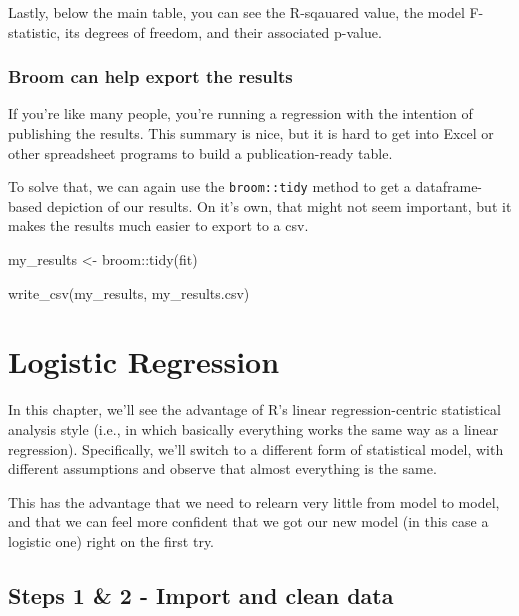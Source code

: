 \documentclass[
]{book}
\newenvironment{Shaded}{\begin{snugshade}}{\end{snugshade}}
\newcommand{\FunctionTok}[1]{\textcolor[rgb]{0.00,0.00,0.00}{#1}}
\newcommand{\NormalTok}[1]{#1}
\newcommand{\OtherTok}[1]{\textcolor[rgb]{0.56,0.35,0.01}{#1}}
\newcommand{\SpecialCharTok}[1]{\textcolor[rgb]{0.00,0.00,0.00}{#1}}
\newcommand{\StringTok}[1]{\textcolor[rgb]{0.31,0.60,0.02}{#1}}
\begin{document}
Lastly, below the main table, you can see the R-sqauared value, the model F-statistic, its degrees of freedom, and their associated p-value.

\hypertarget{broom-can-help-export-the-results}{%
\subsection{Broom can help export the results}\label{broom-can-help-export-the-results}}

If you're like many people, you're running a regression with the intention of publishing the results. This summary is nice, but it is hard to get into Excel or other spreadsheet programs to build a publication-ready table.

To solve that, we can again use the \texttt{broom::tidy} method to get a dataframe-based depiction of our results. On it's own, that might not seem important, but it makes the results much easier to export to a csv.

\begin{Shaded}
\begin{Highlighting}[]
\NormalTok{my\_results }\OtherTok{\textless{}{-}}\NormalTok{ broom}\SpecialCharTok{::}\FunctionTok{tidy}\NormalTok{(fit)}

\FunctionTok{write\_csv}\NormalTok{(my\_results, }\StringTok{\textquotesingle{}my\_results.csv\textquotesingle{}}\NormalTok{)}
\end{Highlighting}
\end{Shaded}

\hypertarget{logistic-regression}{%
\chapter{Logistic Regression}\label{logistic-regression}}

In this chapter, we'll see the advantage of R's linear regression-centric statistical analysis style (i.e., in which basically everything works the same way as a linear regression). Specifically, we'll switch to a different form of statistical model, with different assumptions and observe that almost everything is the same.

This has the advantage that we need to relearn very little from model to model, and that we can feel more confident that we got our new model (in this case a logistic one) right on the first try.

\hypertarget{steps-1-2---import-and-clean-data}{%
\section{Steps 1 \& 2 - Import and clean data}\label{steps-1-2---import-and-clean-data}}
\end{document}
